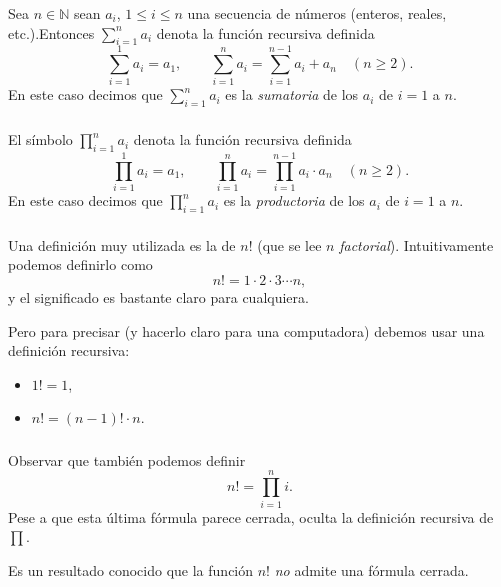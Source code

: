 \documentclass{beamer}
\begin{document}
\begin{frame}\frametitle{} 
\begin{definicion} Sea $n \in \mathbb N$ sean $a_i$,  $1 \le i \le n$ una secuencia de números (enteros, reales, etc.).\pause  Entonces $\sum_{i=1}^{n} a_i$  denota la función recursiva definida  \pause 
	$$
	\sum_{i=1}^{1} a_i= a_1, \qquad \sum_{i=1}^{n} a_i = \sum_{i=1}^{n-1} a_i+ a_{n} \quad (n\ge 2).
	$$\pause 
	En  este caso  decimos que  $\displaystyle\sum_{i=1}^{n} a_i$ es la \textit{sumatoria} de los $a_i$ de $i=1$  a $n$. 
\end{definicion}
	
\end{frame}


\begin{frame}\frametitle{} 
\begin{definicion}
	El símbolo $\displaystyle\prod_{i=1}^{n} a_i$ denota la función recursiva definida  \pause 
	$$
	\prod_{i=1}^{1} a_i= a_1, \qquad \prod_{i=1}^{n} a_i = \prod_{i=1}^{n-1} a_i \cdot  a_{n} \quad (n\ge 2).
	$$\pause 
	En  este caso  decimos que  $\displaystyle\prod_{i=1}^{n} a_i$ es la \textit{productoria} de los $a_i$ de $i=1$  a $n$. 
\end{definicion}
	


\end{frame}



\begin{frame}\frametitle{} 
	Una definición muy utilizada es la de  $n!$ (que se lee $n$ {\it factorial}). Intuitivamente podemos definirlo como \pause 
	$$
	n!=1 \cdot 2 \cdot 3 \cdots n,
	$$\pause 
	y el significado es bastante claro para cualquiera.
	
	\medspace \pause 
	
	Pero para precisar (y hacerlo claro para una computadora) debemos usar una definición recursiva:
	\pause 
	\begin{itemize}
		\item $1! = 1$, \pause 
		\item $n! = (n-1)! \cdot n$.
	\end{itemize}
	
	
	
\end{frame}


\begin{frame}\frametitle{} 	
	Observar que también podemos definir 
	\pause 
	$$n! = \prod_{i=1}^{n} i.$$ 
	\pause 
	Pese a que esta última fórmula parece cerrada, oculta la definición recursiva de $\prod$.
	
	\medspace 
	
	\pause 
	Es un resultado conocido  que la función $n!$ \textit{no} admite  una fórmula cerrada. 
	
\end{frame}
\end{document}
